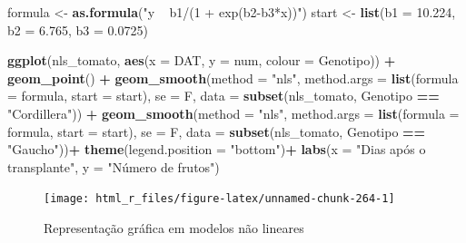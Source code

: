 \documentclass[
]{book}
\newenvironment{Shaded}{\begin{snugshade}}{\end{snugshade}}
\newcommand{\DataTypeTok}[1]{\textcolor[rgb]{0.13,0.29,0.53}{#1}}
\newcommand{\FloatTok}[1]{\textcolor[rgb]{0.00,0.00,0.81}{#1}}
\newcommand{\KeywordTok}[1]{\textcolor[rgb]{0.13,0.29,0.53}{\textbf{#1}}}
\newcommand{\NormalTok}[1]{#1}
\newcommand{\OperatorTok}[1]{\textcolor[rgb]{0.81,0.36,0.00}{\textbf{#1}}}
\newcommand{\StringTok}[1]{\textcolor[rgb]{0.31,0.60,0.02}{#1}}
\begin{document}
\begin{Shaded}
\begin{Highlighting}[]
\NormalTok{formula <-}\StringTok{ }\KeywordTok{as.formula}\NormalTok{(}\StringTok{"y ~ b1/(1 + exp(b2-b3*x))"}\NormalTok{)}
\NormalTok{start <-}\StringTok{ }\KeywordTok{list}\NormalTok{(}\DataTypeTok{b1 =} \FloatTok{10.224}\NormalTok{, }\DataTypeTok{b2 =} \FloatTok{6.765}\NormalTok{, }\DataTypeTok{b3 =} \FloatTok{0.0725}\NormalTok{)}

\KeywordTok{ggplot}\NormalTok{(nls_tomato, }\KeywordTok{aes}\NormalTok{(}\DataTypeTok{x =}\NormalTok{ DAT, }\DataTypeTok{y =}\NormalTok{ num, }\DataTypeTok{colour =}\NormalTok{ Genotipo)) }\OperatorTok{+}\StringTok{ }
\KeywordTok{geom_point}\NormalTok{() }\OperatorTok{+}
\KeywordTok{geom_smooth}\NormalTok{(}\DataTypeTok{method =} \StringTok{"nls"}\NormalTok{, }
            \DataTypeTok{method.args =} \KeywordTok{list}\NormalTok{(}\DataTypeTok{formula =}\NormalTok{ formula, }
                                \DataTypeTok{start =}\NormalTok{ start),}
                                \DataTypeTok{se =}\NormalTok{ F,}
                                \DataTypeTok{data =} \KeywordTok{subset}\NormalTok{(nls_tomato, Genotipo }\OperatorTok{==}\StringTok{ "Cordillera"}\NormalTok{)) }\OperatorTok{+}
\KeywordTok{geom_smooth}\NormalTok{(}\DataTypeTok{method =} \StringTok{"nls"}\NormalTok{, }
            \DataTypeTok{method.args =} \KeywordTok{list}\NormalTok{(}\DataTypeTok{formula =}\NormalTok{ formula, }
                                \DataTypeTok{start =}\NormalTok{ start),}
                                \DataTypeTok{se =}\NormalTok{ F,}
                                \DataTypeTok{data =} \KeywordTok{subset}\NormalTok{(nls_tomato, Genotipo }\OperatorTok{==}\StringTok{ "Gaucho"}\NormalTok{))}\OperatorTok{+}
\KeywordTok{theme}\NormalTok{(}\DataTypeTok{legend.position =} \StringTok{"bottom"}\NormalTok{)}\OperatorTok{+}
\KeywordTok{labs}\NormalTok{(}\DataTypeTok{x =} \StringTok{"Dias após o transplante"}\NormalTok{, }\DataTypeTok{y =} \StringTok{"Número de frutos"}\NormalTok{)}
\end{Highlighting}
\end{Shaded}

\begin{figure}

{\centering \texttt{[image: html\_r\_files/figure-latex/unnamed-chunk-264-1]} 

}

\caption{Representação gráfica em modelos não lineares}\label{fig:unnamed-chunk-264}
\end{figure}
\end{document}
